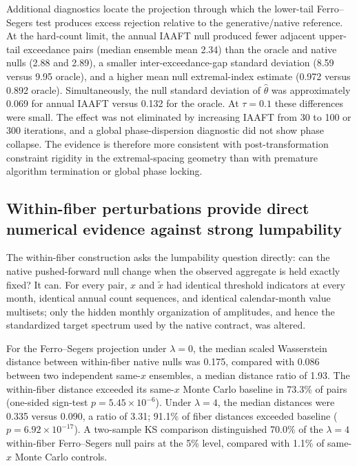 Additional diagnostics locate the projection through which the lower-tail Ferro--Segers test produces excess rejection relative to the generative/native reference. At the hard-count limit, the annual IAAFT null produced fewer adjacent upper-tail exceedance pairs (median ensemble mean 2.34) than the oracle and native nulls (2.88 and 2.89), a smaller inter-exceedance-gap standard deviation (8.59 versus 9.95 oracle), and a higher mean null extremal-index estimate (0.972 versus 0.892 oracle). Simultaneously, the null standard deviation of $\widehat\theta$ was approximately 0.069 for annual IAAFT versus 0.132 for the oracle. At $\tau=0.1$ these differences were small. The effect was not eliminated by increasing IAAFT from 30 to 100 or 300 iterations, and a global phase-dispersion diagnostic did not show phase collapse. The evidence is therefore more consistent with post-transformation constraint rigidity in the extremal-spacing geometry than with premature algorithm termination or global phase locking.

\subsection{Within-fiber perturbations provide direct numerical evidence against strong lumpability}\label{sec:fiberresults}

The within-fiber construction asks the lumpability question directly: can the native pushed-forward null change when the observed aggregate is held exactly fixed? It can. For every pair, $x$ and $\widetilde x$ had identical threshold indicators at every month, identical annual count sequences, and identical calendar-month value multisets; only the hidden monthly organization of amplitudes, and hence the standardized target spectrum used by the native contract, was altered.

For the Ferro--Segers projection under $\lambda=0$, the median scaled Wasserstein distance between within-fiber native nulls was 0.175, compared with 0.086 between two independent same-$x$ ensembles, a median distance ratio of 1.93. The within-fiber distance exceeded its same-$x$ Monte Carlo baseline in 73.3\% of pairs (one-sided sign-test $p=5.45\times10^{-6}$). Under $\lambda=4$, the median distances were 0.335 versus 0.090, a ratio of 3.31; 91.1\% of fiber distances exceeded baseline ($p=6.92\times10^{-17}$). A two-sample KS comparison distinguished 70.0\% of the $\lambda=4$ within-fiber Ferro--Segers null pairs at the 5\% level, compared with 1.1\% of same-$x$ Monte Carlo controls.

